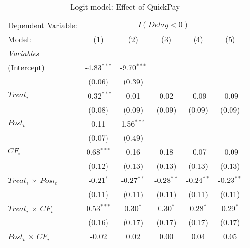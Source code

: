 \documentclass[
]{article}
\begin{document}
\begin{table}[htbp]
   \centering
   \caption{Logit model: Effect of QuickPay}
   \begin{tabular}{lccccc}
      \tabularnewline\midrule\midrule
      Dependent Variable: & \multicolumn{5}{c}{$I(Delay<0)$}\\
      Model:                                        & (1)           & (2)           & (3)          & (4)          & (5)\\
      \midrule \emph{Variables} &   &   &   &   &  \\
      (Intercept)                                   & -4.83$^{***}$ & -9.70$^{***}$ &              &              &   \\
                                                    & (0.06)        & (0.39)        &              &              &   \\
      $Treat_i$                                     & -0.32$^{***}$ & 0.01          & 0.02         & -0.09        & -0.09\\
                                                    & (0.08)        & (0.09)        & (0.09)       & (0.09)       & (0.09)\\
      $Post_t$                                      & 0.11          & 1.56$^{***}$  &              &              &   \\
                                                    & (0.07)        & (0.49)        &              &              &   \\
      $CF_i$                                        & 0.68$^{***}$  & 0.16          & 0.18         & -0.07        & -0.09\\
                                                    & (0.12)        & (0.13)        & (0.13)       & (0.13)       & (0.13)\\
      $Treat_i$ $\times$ $Post_t$                  & -0.21$^{*}$   & -0.27$^{**}$  & -0.28$^{**}$ & -0.24$^{**}$ & -0.23$^{**}$\\
                                                    & (0.11)        & (0.11)        & (0.11)       & (0.11)       & (0.11)\\
      $Treat_i$ $\times$ $CF_i$                    & 0.53$^{***}$  & 0.30$^{*}$    & 0.30$^{*}$   & 0.28$^{*}$   & 0.29$^{*}$\\
                                                    & (0.16)        & (0.17)        & (0.17)       & (0.17)       & (0.17)\\
      $Post_t$ $\times$ $CF_i$                     & -0.02         & 0.02          & 0.00         & 0.04         & 0.05\\

\end{tabular}
\end{table}
\end{document}
